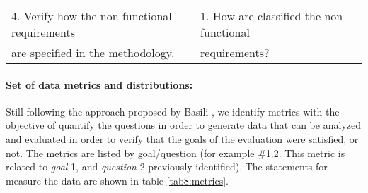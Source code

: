 \begin{table}
\begin{tabular}{|l|l|}
\hline

4. Verify how the non-functional requirements & 1. How are classified the
non-functional \\ 
are specified in the  methodology. & requirements?  \\

\hline
\hline

\hline


\end{tabular}

\end{table}
% 

% 
% 
% 



\paragraph{Set of data metrics and distributions:} Still following the approach
proposed by Basili \cite{basili:1985}, we identify metrics with the objective of quantify the questions in order to generate data that can be
analyzed and evaluated in order to verify that the goals of the evaluation
were satisfied, or not. The metrics are listed by goal/question (for
example \#1.2. This metric is related to \textit{goal} 1, and \textit{question}
2 previously identified). The statements for measure the data are
shown in table \ref{tab8:metrics}.

